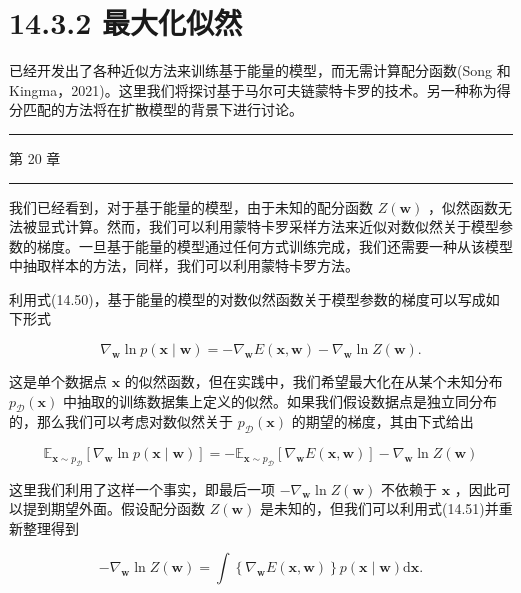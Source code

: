 \documentclass[10pt]{article}
\newcommand{\HRule}{\begin{center}\rule{0.9\linewidth}{0.2mm}\end{center}}
\begin{document}
\section*{14.3.2 最大化似然}

已经开发出了各种近似方法来训练基于能量的模型，而无需计算配分函数(Song 和 Kingma，2021)。这里我们将探讨基于马尔可夫链蒙特卡罗的技术。另一种称为得分匹配的方法将在扩散模型的背景下进行讨论。

\HRule

第 20 章

\HRule

我们已经看到，对于基于能量的模型，由于未知的配分函数 \(Z\left( \mathbf{w}\right)\) ，似然函数无法被显式计算。然而，我们可以利用蒙特卡罗采样方法来近似对数似然关于模型参数的梯度。一旦基于能量的模型通过任何方式训练完成，我们还需要一种从该模型中抽取样本的方法，同样，我们可以利用蒙特卡罗方法。

利用式(14.50)，基于能量的模型的对数似然函数关于模型参数的梯度可以写成如下形式

\[
{\nabla }_{\mathbf{w}}\ln p\left( {\mathbf{x} \mid  \mathbf{w}}\right)  =  - {\nabla }_{\mathbf{w}}E\left( {\mathbf{x},\mathbf{w}}\right)  - {\nabla }_{\mathbf{w}}\ln Z\left( \mathbf{w}\right) . \tag{14.53}
\]

这是单个数据点 \(\mathbf{x}\) 的似然函数，但在实践中，我们希望最大化在从某个未知分布 \({p}_{\mathcal{D}}\left( \mathbf{x}\right)\) 中抽取的训练数据集上定义的似然。如果我们假设数据点是独立同分布的，那么我们可以考虑对数似然关于 \({p}_{\mathcal{D}}\left( \mathbf{x}\right)\) 的期望的梯度，其由下式给出

\[
{\mathbb{E}}_{\mathbf{x} \sim  {p}_{\mathcal{D}}}\left\lbrack  {{\nabla }_{\mathbf{w}}\ln p\left( {\mathbf{x} \mid  \mathbf{w}}\right) }\right\rbrack   =  - {\mathbb{E}}_{\mathbf{x} \sim  {p}_{\mathcal{D}}}\left\lbrack  {{\nabla }_{\mathbf{w}}E\left( {\mathbf{x},\mathbf{w}}\right) }\right\rbrack   - {\nabla }_{\mathbf{w}}\ln Z\left( \mathbf{w}\right)  \tag{14.54}
\]

这里我们利用了这样一个事实，即最后一项 \(- {\nabla }_{\mathbf{w}}\ln Z\left( \mathbf{w}\right)\) 不依赖于 \(\mathbf{x}\) ，因此可以提到期望外面。假设配分函数 \(Z\left( \mathbf{w}\right)\) 是未知的，但我们可以利用式(14.51)并重新整理得到

\[
- {\nabla }_{\mathbf{w}}\ln Z\left( \mathbf{w}\right)  = \int \left\{  {{\nabla }_{\mathbf{w}}E\left( {\mathbf{x},\mathbf{w}}\right) }\right\}  p\left( {\mathbf{x} \mid  \mathbf{w}}\right) \mathrm{d}\mathbf{x}. \tag{14.55}
\]
\end{document}
